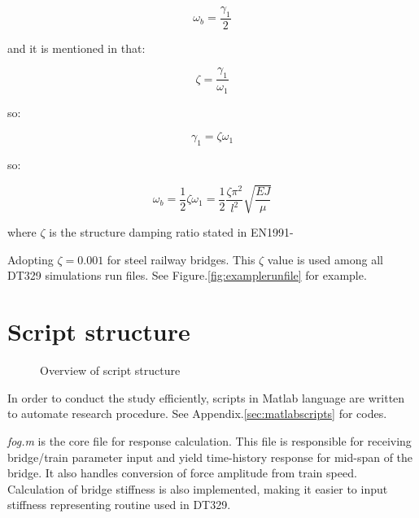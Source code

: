 \begin{equation}
    \omega_b = \frac{\gamma_1}{2}
\end{equation}

and it is mentioned in \cite[Eq.8]{abu2000vibration} that:

$$\zeta = \frac{\gamma_1}{\omega_1}$$

so:

$$\gamma_1 = \zeta\omega_1$$

so:

$$\omega_b = \frac{1}{2}\zeta\omega_1 = \frac{1}{2}\frac{\zeta\pi^2}{l^2}\sqrt{\frac{EJ}{\mu}}$$

where $\zeta$ is the structure damping ratio stated in EN1991-

Adopting $\zeta = 0.001$ for steel railway bridges. This $\zeta$ value is used among all DT329 simulations run files. See Figure.\ref{fig:examplerunfile} for example.

\section{Script structure}
\begin{figure}[h]
\centering
{}

\caption{Overview of script structure }
\label{fig:scriptstructure}
\end{figure}

In order to conduct the study efficiently, scripts in Matlab language are written to automate research procedure. See Appendix.\ref{sec:matlabscripts} for codes.

\textit{fog.m} is the core file for response calculation. This file is responsible for receiving bridge/train parameter input and yield time-history response for mid-span of the bridge. It also handles conversion of force amplitude from train speed. Calculation of bridge stiffness is also implemented, making it easier to input stiffness representing routine used in DT329.


